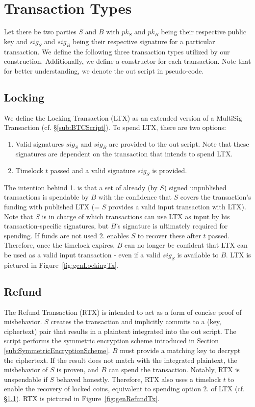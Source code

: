 \documentclass{cacthesis}
\begin{document}
	   \section{Transaction Types}
	   \label{sec:OurTransactionTypes}
        Let there be two parties $S$ and $B$ with $pk_S$ and $pk_B$  being their respective public key and $sig_S$ and $sig_B$ being their respective signature for a particular transaction. We define the following three transaction types utilized by our construction. Additionally, we define a constructor for each transaction. Note that for better understanding, we denote the out script in pseudo-code.
        
        \subsection{Locking}
        \label{sub:LockingTx}
        We define the Locking Transaction (LTX) as an extended version of a MultiSig Transaction (cf. §\ref{sub:BTCScript}). To spend LTX, there are two options:
        \begin{enumerate}
	        \item Valid signatures $sig_S$ and $sig_B$ are provided to the out script. Note that these signatures are dependent on the transaction that intends to spend LTX.
	        \item Timelock $t$ passed and a valid signature $sig_S$ is provided.
        \end{enumerate}
        The intention behind 1. is that a set of already (by $S$) signed unpublished transactions is spendable by $B$ with the confidence that $S$ covers the transaction's funding with published LTX (= $S$ provides a valid input transaction with LTX). Note that $S$ is in charge of which transactions can use LTX as input by his transaction-specific signatures, but $B$'s signature is ultimately required for spending.
        If funds are not used 2. enables $S$ to recover these after $t$ passed. Therefore, once the timelock expires, $B$ can no longer be confident that LTX can be used as a valid input transaction - even if a valid $sig_S$ is available to $B$. LTX is pictured in \mbox{Figure \ref{fig:genLockingTx}}.
        
        \subsection{Refund}
        \label{sub:RefundTx}
        The Refund Transaction (RTX) is intended to act as a form of concise proof of misbehavior. $S$ creates the transaction and implicitly commits to a (key, ciphertext) pair that results in a plaintext integrated into the out script. The script performs the symmetric encryption scheme introduced in Section \ref{sub:SymmetricEncryptionScheme}. $B$ must provide a matching key to decrypt the ciphertext. If the result does not match with the integrated plaintext, the misbehavior of $S$ is proven, and $B$ can spend the transaction. Notably, RTX is unspendable if $S$ behaved honestly. Therefore, RTX also uses a timelock $t$ to enable the recovery of locked coins, equivalent to spending option 2. of LTX (cf. §\ref{sub:LockingTx}). RTX is pictured in \mbox{Figure \ref{fig:genRefundTx}}.   
        
\end{document}
